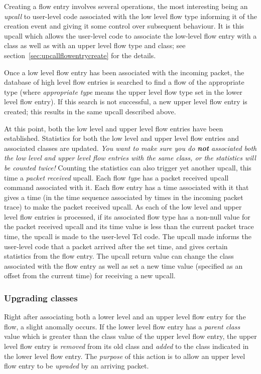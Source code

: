 \documentclass{article}
\begin{document}
Creating a flow entry involves several operations, the most interesting
being an \emph{upcall} to user-level code associated with the low level
flow type informing it of the creation event and giving it some control
over subsequent behaviour.  It is this upcall which allows the
user-level code to associate the low-level flow entry with a class as
well as with an upper level flow type and class; see
section~\ref{sec:upcallflowentrycreate} for the details.

Once a low level flow entry has been associated with the incoming
packet, the database of high level flow entries is searched to find a
flow of the appropriate type (where \emph{appropriate type} means the
upper level flow type set in the lower level flow entry).  If this
search is not successful, a new upper level flow entry is created; this
results in the same upcall described above.

At this point, both the low level and upper level flow entries have
been established.  Statistics for both the low level and upper level
flow entries and associated classes are updated.  \emph{You want to
make sure you do \textbf{not} associated both the low level and upper
level flow entries with the same class, or the statistics will be
counted twice!}  Counting the statistics can also trigger yet another
upcall, this time a \emph{packet received} upcall.  Each flow
\emph{type} has a packet received upcall command associated with it.
Each flow entry has a time associated with it that gives a time (in the
time sequence associated by times in the incoming packet trace) to make
the packet received upcall.  As each of the low level and upper level
flow entries is processed, if its associated flow type has a non-null
value for the packet received upcall and its time value is less than
the current packet trace time, the upcall is made to the user-level Tcl
code.  The upcall made informs the user-level code that a packet
arrived after the set time, and gives certain statistics from the flow
entry.  The upcall return value can change the class associated with
the flow entry as well as set a new time value (specified as an offset
from the current time) for receiving a new upcall.

\subsubsection{Upgrading classes}

Right after associating both a lower level and an upper level flow
entry for the flow, a slight anomally occurs.  If the lower level flow
entry has a \emph{parent class} value which is greater than the class
value of the upper level flow entry, the upper level flow entry is
\emph{removed} from its old class and \emph{added} to the class
indicated in the lower level flow entry.  The \emph{purpose} of this
action is to allow an upper level flow entry to be \emph{upraded} by an
arriving packet.
\end{document}
